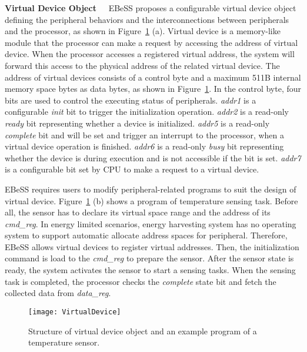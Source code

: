 \textbf{Virtual Device Object\ \ }
EBeSS proposes a configurable virtual device object defining the peripheral behaviors and the interconnections between peripherals and the processor, as shown in Figure~\ref{fig:VirtualDevice} (a).
Virtual device is a memory-like module that the processor can make a request by accessing the address of virtual device. 
When the processor accesses a registered virtual address, the system will forward this access to the physical address of the related virtual device.
The address of virtual devices consists of a control byte and a maximum 511B internal memory space bytes as data bytes, as shown in Figure~\ref{fig:VirtualDevice}.
In the control byte, four bits are used to control the executing status of peripherals.
\emph{addr1} is a configurable \emph{init} bit to trigger the initialization operation.
\emph{addr2} is a read-only \emph{ready} bit representing whether a device is initialized.
\emph{addr5} is a read-only \emph{complete} bit and will be set and trigger an interrupt to the processor, when a virtual device operation is finished.
\emph{addr6} is a read-only \emph{busy} bit representing whether the device is during execution and is not accessible if the bit is set.
\emph{addr7} is a configurable bit set by CPU to make a request to a virtual device.

EBeSS requires users to modify peripheral-related programs to suit the design of virtual device.
Figure~\ref{fig:VirtualDevice} (b) shows a program of temperature sensing task. 
Before all, the sensor has to declare its virtual space range and the address of its \emph{cmd\_reg}. 
In energy limited scenarios, energy harvesting system has no operating system to support automatic allocate address spaces for peripheral.
Therefore, EBeSS allows virtual devices to register virtual addresses.
Then, the initialization command is load to the \emph{cmd\_reg} to prepare the sensor.
After the sensor state is ready, the system activates the sensor to start a sensing tasks.
When the sensing task is completed, the processor checks the \emph{complete} state bit and fetch the collected data from \emph{data\_reg}.

\begin{figure}[!htpb]
	\centering
	\vspace{-5pt}
	\texttt{[image: VirtualDevice]}
	\vspace{-5pt}
	\caption{Structure of virtual device object and an example program of a temperature sensor.}	\label{fig:VirtualDevice}
\end{figure}

